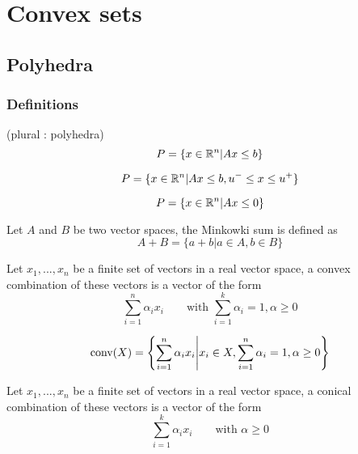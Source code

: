 \chapter{Convex sets}

\section{Polyhedra}

\subsection{Definitions}
\begin{definition}[Polyhedron] (plural : polyhedra)
    \[
        P = \{ x\in\mathbb R^n | Ax\le b \}
    \]
\end{definition}

\begin{definition}[Polytope]
    \[
        P = \{ x\in\mathbb R^n | Ax\le b, u^- \le x \le u^+ \}
    \]
\end{definition}

\begin{definition}
    \[
        P = \{ x\in\mathbb R^n | Ax \le 0 \}
    \]
\end{definition}

\begin{definition}
    Let $A$ and $B$ be two vector spaces, the Minkowki sum is defined as
    \[
        A + B = \{ a + b | a\in A, b\in B \}
    \]
\end{definition}

\begin{definition}
    Let $x_1,...,x_n$ be a finite set of vectors in a real vector space, a convex combination of these vectors is a vector of the form 
    \[
        \sum_{i=1}^n\alpha_ix_i\qquad\textrm{with } \sum_{i=1}^k\alpha_i = 1, \alpha\ge 0
    \]
\end{definition}

\begin{definition}
    \[
        \textrm{conv}(X) = \left\{ \sum_{i=1}^n\alpha_ix_i \middle| x_i\in X, \sum_{i=1}^n\alpha_i = 1, \alpha\ge 0 \right\}
    \]
\end{definition}

\begin{definition}
    Let $x_1,...,x_n$ be a finite set of vectors in a real vector space, a conical combination of these vectors is a vector of the form 
    \[
        \sum_{i=1}^k \alpha_ix_i \qquad\textrm{with } \alpha\ge 0
    \]
\end{definition}

